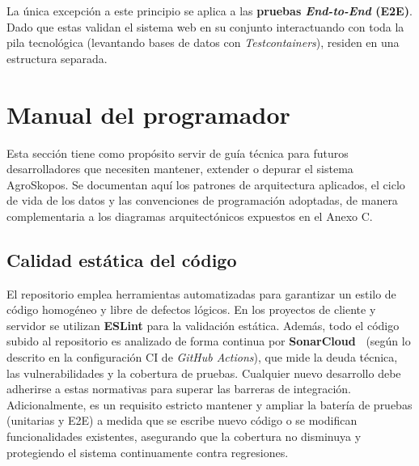 La única excepción a este principio se aplica a las \textbf{pruebas \textit{End-to-End} (E2E)}. Dado que estas validan el sistema web en su conjunto interactuando con toda la pila tecnológica (levantando bases de datos con \textit{Testcontainers}), residen en una estructura separada.

\section{Manual del programador}

Esta sección tiene como propósito servir de guía técnica para futuros desarrolladores que necesiten mantener, extender o depurar el sistema AgroSkopos. Se documentan aquí los patrones de arquitectura aplicados, el ciclo de vida de los datos y las convenciones de programación adoptadas, de manera complementaria a los diagramas arquitectónicos expuestos en el Anexo C.

\subsection{Calidad estática del código}
El repositorio emplea herramientas automatizadas para garantizar un estilo de código homogéneo y libre de defectos lógicos. En los proyectos de cliente y servidor se utilizan \textbf{ESLint} para la validación estática. Además, todo el código subido al repositorio es analizado de forma continua por \textbf{SonarCloud~\cite{sonarqube}} (según lo descrito en la configuración CI de \textit{GitHub Actions}), que mide la deuda técnica, las vulnerabilidades y la cobertura de pruebas. Cualquier nuevo desarrollo debe adherirse a estas normativas para superar las barreras de integración. Adicionalmente, es un requisito estricto mantener y ampliar la batería de pruebas (unitarias y E2E) a medida que se escribe nuevo código o se modifican funcionalidades existentes, asegurando que la cobertura no disminuya y protegiendo el sistema continuamente contra regresiones.


